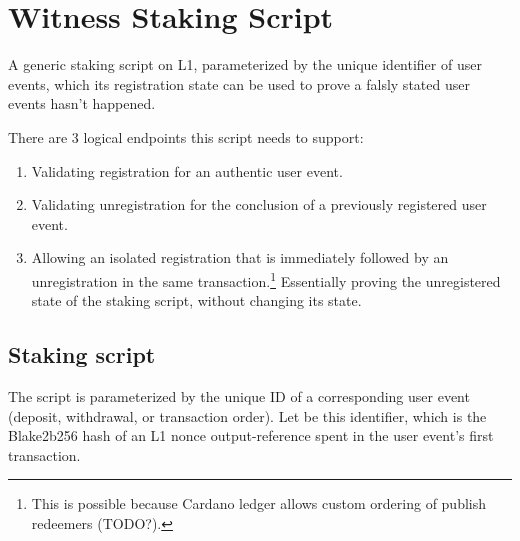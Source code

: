 \documentclass[../midgard.tex]{subfiles}
\begin{document}
\section{Witness Staking Script}
\label{h:witness}

A generic staking script on L1, parameterized by the unique identifier of user events, which its registration state can be used to prove a falsly stated user events hasn't happened.

There are 3 logical endpoints this script needs to support:
\begin{enumerate}
    \item Validating registration for an authentic user event.
    \item Validating unregistration for the conclusion of a previously registered user event.
    \item Allowing an isolated registration that is immediately followed by an unregistration in the same transaction.\footnote{This is possible because Cardano ledger allows custom ordering of publish redeemers (TODO?).}
      Essentially proving the unregistered state of the staking script, without changing its state.
\end{enumerate}

\subsection{Staking script}
\label{h:witness-staking-script}
The  script is parameterized by the unique ID of a corresponding user event (deposit, withdrawal, or transaction order).
Let  be this identifier, which is the Blake2b256 hash of an L1 nonce output-reference spent in the user event's first transaction.
\end{document}
